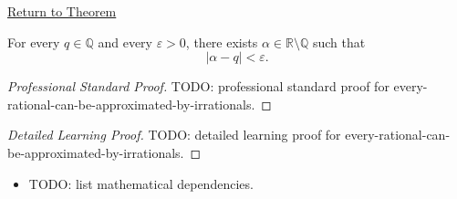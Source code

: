 \newpage
{}
\label{prf:every-rational-can-be-approximated-by-irrationals}

\begin{remark*}[Return]
\hyperref[cor:every-rational-can-be-approximated-by-irrationals]{Return to Theorem}
\end{remark*}

\begin{corollary*}
For every $q\in\mathbb{Q}$ and every $\varepsilon>0$, there exists
$\alpha\in\mathbb{R}\setminus\mathbb{Q}$ such that
\[
|\alpha-q|<\varepsilon.
\]
\end{corollary*}

\begin{proof}[Professional Standard Proof]
\LRAProofBodyStart
TODO: professional standard proof for every-rational-can-be-approximated-by-irrationals.
\end{proof}

\begin{proof}[Detailed Learning Proof]
\LRAProofBodyStart
TODO: detailed learning proof for every-rational-can-be-approximated-by-irrationals.
\end{proof}

\begin{remark*}
\end{remark*}

\begin{dependencies}
\begin{itemize}
  \item TODO: list mathematical dependencies.
\end{itemize}
\end{dependencies}

\clearpage
